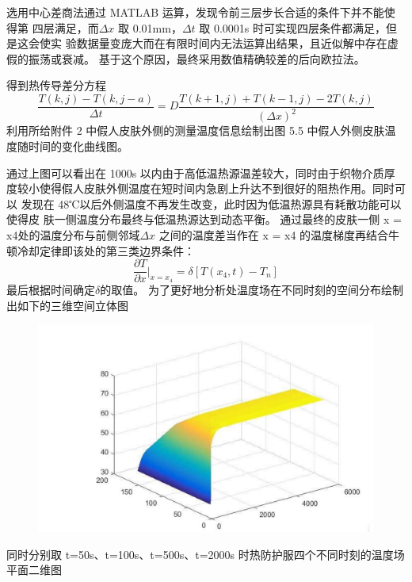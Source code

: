 \documentclass{article}
\begin{document}
	选用中心差商法通过 MATLAB 运算，发现令前三层步长合适的条件下并不能使得第
	四层满足，而$\varDelta x$ 取 0.01mm，$\varDelta t$ 取 0.0001s 时可实现四层条件都满足，但是这会使实
	验数据量变庞大而在有限时间内无法运算出结果，且近似解中存在虚假的振荡或衰减。
	基于这个原因，最终采用数值精确较差的后向欧拉法。
	
	得到热传导差分方程$$ \frac{T(k,j)-T(k,j-a)}{\varDelta t} = D\frac{T(k+1,j)+T(k-1,j)-2T(k,j)}{(\varDelta x)^{2}}  $$
	利用所给附件 2 中假人皮肤外侧的测量温度信息绘制出图 5.5 中假人外侧皮肤温
	度随时间的变化曲线图。
	
	
	通过上图可以看出在 1000s 以内由于高低温热源温差较大，同时由于织物介质厚
	度较小使得假人皮肤外侧温度在短时间内急剧上升达不到很好的阻热作用。同时可以
	发现在 48℃以后外侧温度不再发生改变，此时因为低温热源具有耗散功能可以使得皮
	肤一侧温度分布最终与低温热源达到动态平衡。
	通过最终的皮肤一侧 x = x4处的温度分布与前侧邻域$\varDelta x$ 之间的温度差当作在 x = x4
	的温度梯度再结合牛顿冷却定律即该处的第三类边界条件：$$\frac{\partial T}{\partial x}|  _{x=x_{4}} = \delta [T(x_{4},t)-T_{n}] $$
	最后根据时间确定$\delta $的取值。
	为了更好地分析处温度场在不同时刻的空间分布绘制出如下的三维空间立体图
	
	\begin{figure}[htbp]
		\centering
		\includegraphics[scale=0.2]{屏幕截图 2024-07-15 222946.png}
	\end{figure}
	
	同时分别取 t=50s、t=100s、t=500s、t=2000s 时热防护服四个不同时刻的温度场
	平面二维图
	
\end{document}
